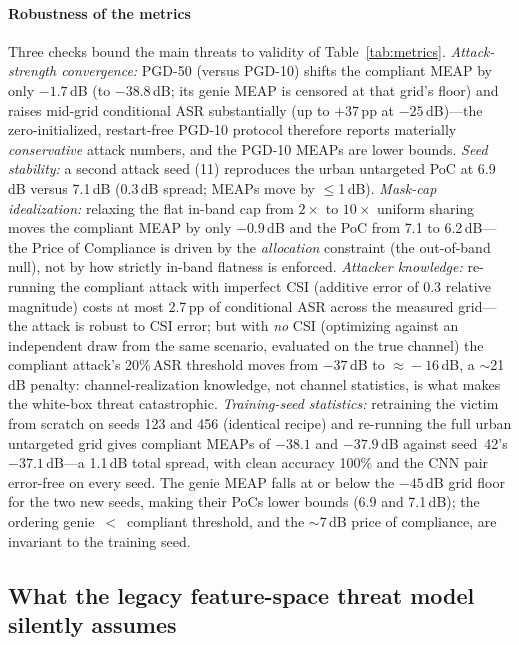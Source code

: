 \documentclass[review]{elsarticle}
\begin{document}
\paragraph{Robustness of the metrics} Three checks bound the main threats to
validity of Table~\ref{tab:metrics}. \emph{Attack-strength convergence:}
PGD-50 (versus PGD-10) shifts the compliant MEAP by only $-1.7$\,dB (to
$-38.8$\,dB; its genie MEAP is censored at that grid's floor) and raises
mid-grid conditional ASR substantially (up to $+37$\,pp at $-25$\,dB)---the
zero-initialized, restart-free PGD-10 protocol therefore reports materially
\emph{conservative} attack numbers, and the PGD-10 MEAPs are lower bounds.
\emph{Seed stability:} a second attack
seed (11) reproduces the urban untargeted PoC at 6.9\,dB versus 7.1\,dB
(0.3\,dB spread; MEAPs move by $\le$1\,dB). \emph{Mask-cap idealization:}
relaxing the flat in-band cap from $2\times$ to $10\times$ uniform sharing
moves the compliant MEAP by only $-0.9$\,dB and the PoC from 7.1 to
6.2\,dB---the Price of Compliance is driven by the \emph{allocation}
constraint (the out-of-band null), not by how strictly in-band flatness is
enforced. \emph{Attacker knowledge:} re-running the compliant attack with
imperfect CSI (additive error of 0.3 relative magnitude) costs at most
2.7\,pp of conditional ASR across the measured grid---the attack is robust
to CSI error; but with \emph{no} CSI (optimizing against
an independent draw from the same scenario, evaluated on the true channel)
the compliant attack's 20\%\,ASR threshold moves from $-37$\,dB to
$\approx\!-16$\,dB, a $\sim$21\,dB penalty: channel-realization
knowledge, not channel statistics, is what makes the white-box threat
catastrophic. \emph{Training-seed statistics:} retraining the victim from
scratch on seeds 123 and 456 (identical recipe) and re-running the full
urban untargeted grid gives compliant MEAPs of $-38.1$ and $-37.9$\,dB
against seed~42's $-37.1$\,dB---a 1.1\,dB total spread, with clean
accuracy 100\% and the CNN pair error-free on every seed. The genie MEAP
falls at or below the $-45$\,dB grid floor for the two new seeds, making
their PoCs lower bounds (6.9 and 7.1\,dB); the ordering genie~$<$~compliant
threshold, and the ${\sim}$7\,dB price of compliance, are invariant to
the training seed.

\subsection{What the legacy feature-space threat model silently assumes}
\label{sec:featurespace}
\end{document}
